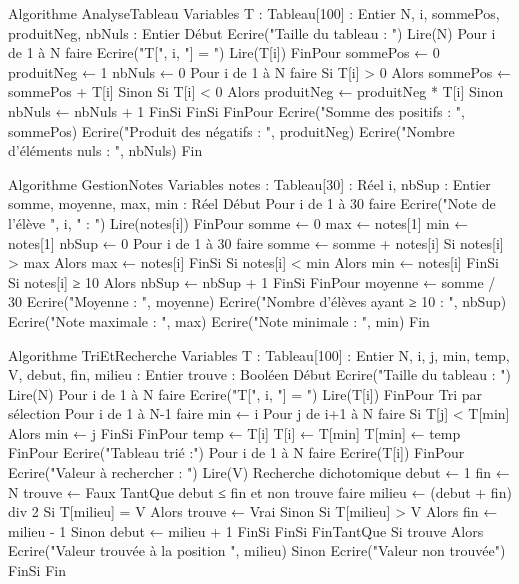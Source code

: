 \begin{algo}
Algorithme AnalyseTableau
Variables
    T : Tableau[100] : Entier
    N, i, sommePos, produitNeg, nbNuls : Entier
Début
    Ecrire("Taille du tableau : ")
    Lire(N)
    Pour i de 1 à N faire
        Ecrire("T[", i, "] = ")
        Lire(T[i])
    FinPour
    sommePos ← 0
    produitNeg ← 1
    nbNuls ← 0
    Pour i de 1 à N faire
        Si T[i] > 0 Alors
            sommePos ← sommePos + T[i]
        Sinon
            Si T[i] < 0 Alors
                produitNeg ← produitNeg * T[i]
            Sinon
                nbNuls ← nbNuls + 1
            FinSi
        FinSi
    FinPour
    Ecrire("Somme des positifs : ", sommePos)
    Ecrire("Produit des négatifs : ", produitNeg)
    Ecrire("Nombre d'éléments nuls : ", nbNuls)
Fin
\end{algo}

\begin{algo}
Algorithme GestionNotes
Variables
    notes : Tableau[30] : Réel
    i, nbSup : Entier
    somme, moyenne, max, min : Réel
Début
    Pour i de 1 à 30 faire
        Ecrire("Note de l'élève ", i, " : ")
        Lire(notes[i])
    FinPour
    somme ← 0
    max ← notes[1]
    min ← notes[1]
    nbSup ← 0
    Pour i de 1 à 30 faire
        somme ← somme + notes[i]
        Si notes[i] > max Alors
            max ← notes[i]
        FinSi
        Si notes[i] < min Alors
            min ← notes[i]
        FinSi
        Si notes[i] ≥ 10 Alors
            nbSup ← nbSup + 1
        FinSi
    FinPour
    moyenne ← somme / 30
    Ecrire("Moyenne : ", moyenne)
    Ecrire("Nombre d'élèves ayant ≥ 10 : ", nbSup)
    Ecrire("Note maximale : ", max)
    Ecrire("Note minimale : ", min)
Fin
\end{algo}

\begin{algo}
Algorithme TriEtRecherche
Variables
    T : Tableau[100] : Entier
    N, i, j, min, temp, V, debut, fin, milieu : Entier
    trouve : Booléen
Début
    Ecrire("Taille du tableau : ")
    Lire(N)
    Pour i de 1 à N faire
        Ecrire("T[", i, "] = ")
        Lire(T[i])
    FinPour
    {Tri par sélection}
    Pour i de 1 à N-1 faire
        min ← i
        Pour j de i+1 à N faire
            Si T[j] < T[min] Alors
                min ← j
            FinSi
        FinPour
        temp ← T[i]
        T[i] ← T[min]
        T[min] ← temp
    FinPour
    Ecrire("Tableau trié :")
    Pour i de 1 à N faire
        Ecrire(T[i])
    FinPour
    Ecrire("Valeur à rechercher : ")
    Lire(V)
    {Recherche dichotomique}
    debut ← 1
    fin ← N
    trouve ← Faux
    TantQue debut ≤ fin et non trouve faire
        milieu ← (debut + fin) div 2
        Si T[milieu] = V Alors
            trouve ← Vrai
        Sinon
            Si T[milieu] > V Alors
                fin ← milieu - 1
            Sinon
                debut ← milieu + 1
            FinSi
        FinSi
    FinTantQue
    Si trouve Alors
        Ecrire("Valeur trouvée à la position ", milieu)
    Sinon
        Ecrire("Valeur non trouvée")
    FinSi
Fin
\end{algo}